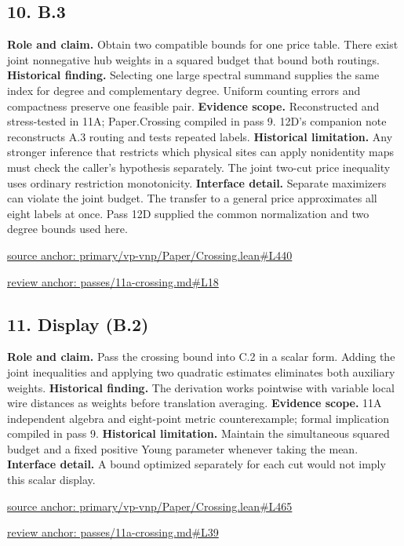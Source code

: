 \documentclass[11pt,letterpaper]{article}
\theoremstyle{definition}\newtheorem{definition}[theorem]{Definition}\newtheorem{example}[theorem]{Example}
\theoremstyle{remark}\newtheorem{remark}[theorem]{Remark}
\begin{document}
\subsection*{10. B.3}
\textbf{Role and claim.} Obtain two compatible bounds for one price table. There exist joint nonnegative hub weights in a squared budget that bound both routings.
\textbf{Historical finding.} Selecting one large spectral summand supplies the same index for degree and complementary degree. Uniform counting errors and compactness preserve one feasible pair.
\textbf{Evidence scope.} Reconstructed and stress-tested in 11A; Paper.Crossing compiled in pass 9. 12D's companion note reconstructs A.3 routing and tests repeated labels.
\textbf{Historical limitation.} Any stronger inference that restricts which physical sites can apply nonidentity maps must check the caller's hypothesis separately. The joint two-cut price inequality uses ordinary restriction monotonicity.
\textbf{Interface detail.} Separate maximizers can violate the joint budget. The transfer to a general price approximates all eight labels at once. Pass 12D supplied the common normalization and two degree bounds used here.
\par\href{https://github.com/nousentllc/VP-VNP-Review/blob/8a7976933b6b2b4ffda1ad3a0dfb5fc6b6f023e8/primary/vp-vnp/Paper/Crossing.lean\#L440}{source anchor: primary/vp-vnp/Paper/Crossing.lean\#L440}
\par\href{https://github.com/nousentllc/VP-VNP-Review/blob/8a7976933b6b2b4ffda1ad3a0dfb5fc6b6f023e8/passes/11a-crossing.md\#L18}{review anchor: passes/11a-crossing.md\#L18}
\goodbreak
{}
\hypertarget{claim.11}{}
\subsection*{11. Display (B.2)}
\textbf{Role and claim.} Pass the crossing bound into C.2 in a scalar form. Adding the joint inequalities and applying two quadratic estimates eliminates both auxiliary weights.
\textbf{Historical finding.} The derivation works pointwise with variable local wire distances as weights before translation averaging.
\textbf{Evidence scope.} 11A independent algebra and eight-point metric counterexample; formal implication compiled in pass 9.
\textbf{Historical limitation.} Maintain the simultaneous squared budget and a fixed positive Young parameter whenever taking the mean.
\textbf{Interface detail.} A bound optimized separately for each cut would not imply this scalar display.
\par\href{https://github.com/nousentllc/VP-VNP-Review/blob/8a7976933b6b2b4ffda1ad3a0dfb5fc6b6f023e8/primary/vp-vnp/Paper/Crossing.lean\#L465}{source anchor: primary/vp-vnp/Paper/Crossing.lean\#L465}
\par\href{https://github.com/nousentllc/VP-VNP-Review/blob/8a7976933b6b2b4ffda1ad3a0dfb5fc6b6f023e8/passes/11a-crossing.md\#L39}{review anchor: passes/11a-crossing.md\#L39}
\goodbreak
{}
\hypertarget{claim.12}{}
\end{document}
